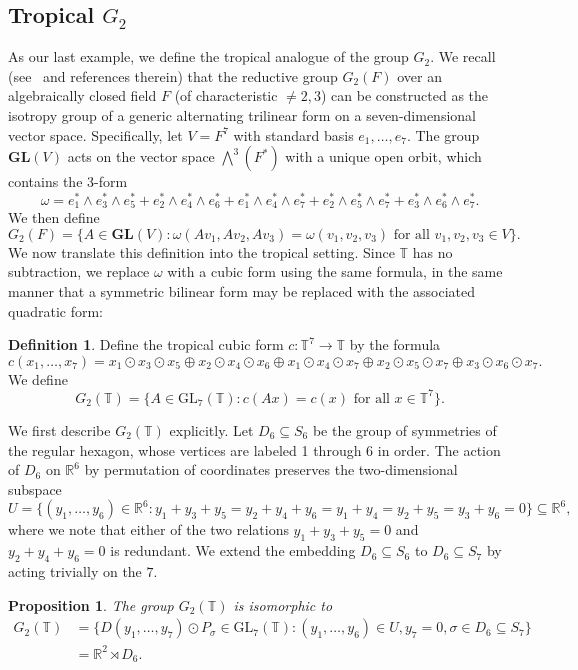 \documentclass[10pt, a4paper]{amsart}
\newtheorem{proposition}[theorem]{Proposition}
\theoremstyle{definition}
\newtheorem{definition}[theorem]{Definition}
\theoremstyle{myitemstyle}
\newcommand{\RR}{\mathbb{R}}
\newcommand{\TT}{\mathbb{T}}
\newcommand{\bGL}{\mathbf{GL}}
\newcommand{\GL}{{\mathrm{GL}}}
\begin{document}
\subsection{Tropical $G_2$} \label{subsec:G2} As our last example, we define the tropical analogue of the group $G_2$. We recall (see~\cite{1988CohenHelminck} and references therein) that the reductive group $G_2(F)$ over an algebraically closed field $F$ (of characteristic $\neq 2,3$) can be constructed as the isotropy group of a generic alternating trilinear form on a seven-dimensional vector space. Specifically, let $V=F^7$ with standard basis $e_1,\ldots,e_7$. The group $\bGL(V)$ acts on the vector space $\bigwedge^3(F^*)$ with a unique open orbit, which contains the 3-form
\[
\omega=e_1^*\wedge e_3^*\wedge e_5^*+e_2^*\wedge e_4^*\wedge e_6^*+
e_1^*\wedge e_4^*\wedge e_7^*+e_2^*\wedge e_5^*\wedge e_7^*+
e_3^*\wedge e_6^*\wedge e_7^*.
\]
We then define
\[
G_2(F)=\{A\in \bGL(V):\omega(Av_1,Av_2,Av_3)=\omega(v_1,v_2,v_3)\mbox{ for all }v_1,v_2,v_3\in V\}.
\]
We now translate this definition into the tropical setting. Since $\TT$ has no subtraction, we replace $\omega$ with a cubic form using the same formula, in the same manner that a symmetric bilinear form may be replaced with the associated quadratic form:

\begin{definition} Define the tropical cubic form $c:\TT^7\to \TT$ by the formula
\[
c(x_1,\ldots,x_7)=x_1\odot x_3\odot x_5\oplus x_2\odot x_4\odot x_6\oplus x_1\odot x_4\odot x_7\oplus x_2\odot x_5\odot x_7\oplus x_3\odot x_6\odot x_7.
\]
We define
\[
G_2(\TT)=\{A\in \GL_7(\TT):c(Ax)=c(x)\mbox{ for all }x\in \TT^7\}.
\]
    
\end{definition}

We first describe $G_2(\TT)$ explicitly. Let $D_6\subseteq S_6$ be the group of symmetries of the regular hexagon, whose vertices are labeled 1 through 6 in order. The action of $D_6$ on $\RR^6$ by permutation of coordinates preserves the two-dimensional subspace
\[
U=\{(y_1,\ldots,y_6)\in \RR^6:y_1+y_3+y_5=y_2+y_4+y_6=y_1+y_4=y_2+y_5=y_3+y_6=0 \}\subseteq \RR^6,
\]
where we note that either of the two relations $y_1+y_3+y_5=0$ and $y_2+y_4+y_6=0$ is redundant. We extend the embedding $D_6\subseteq S_6$ to $D_6\subseteq S_7$ by acting trivially on the $7$. 

\begin{proposition} The group $G_2(\TT)$ is isomorphic to
\[
\begin{split}
G_2(\TT)&=\{D(y_1,\ldots,y_7)\odot P_{\sigma}\in \GL_7(\TT):(y_1,\ldots,y_6)\in U,y_7=0,\sigma\in D_6\subseteq S_7\}\\
&=\RR^2 \rtimes D_6.
\end{split}
\]
\end{proposition}
\end{document}
